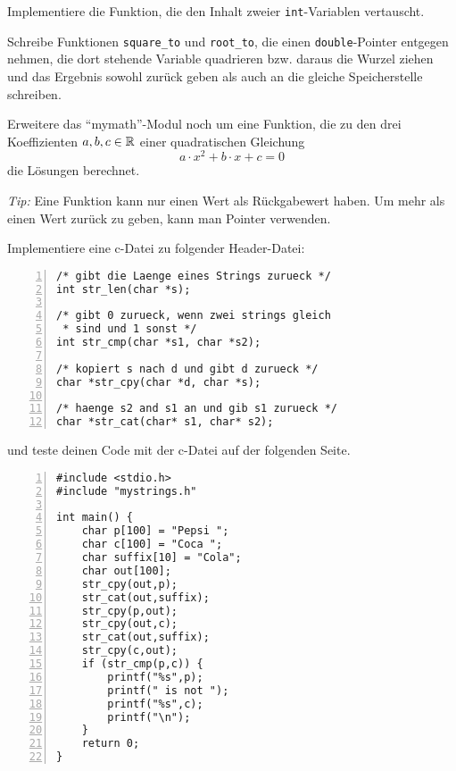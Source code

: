 \documentclass{uebungszettel}
\begin{document}
\begin{aufg}
Implementiere die Funktion, die den Inhalt zweier \verb|int|-Variablen vertauscht.
\end{aufg}

\begin{aufg}
Schreibe Funktionen \verb|square_to| und \verb|root_to|, die einen \verb|double|-Pointer entgegen nehmen, die dort stehende Variable quadrieren bzw. daraus die Wurzel ziehen und das Ergebnis sowohl zurück geben als auch an die gleiche Speicherstelle schreiben.
\end{aufg}

\begin{aufg}
Erweitere das "`mymath"'-Modul noch um eine Funktion, die zu den drei Koeffizienten $a, b, c \in \mathbb{R}$ einer quadratischen Gleichung $$
a \cdot x^2 + b \cdot x + c = 0 $$
die Lösungen berechnet.

\medskip \noindent \emph{Tip:} Eine Funktion kann nur einen Wert als Rückgabewert haben. Um mehr als einen Wert zurück zu geben, kann man Pointer verwenden.
\end{aufg}

\begin{aufg} Implementiere eine c-Datei zu folgender Header-Datei: 
\begin{codelisting}
\begin{lstlisting}[numbers=left,numberstyle=\tiny,frame=tlrb]
/* gibt die Laenge eines Strings zurueck */
int str_len(char *s); 

/* gibt 0 zurueck, wenn zwei strings gleich 
 * sind und 1 sonst */
int str_cmp(char *s1, char *s2);

/* kopiert s nach d und gibt d zurueck */
char *str_cpy(char *d, char *s);

/* haenge s2 and s1 an und gib s1 zurueck */ 
char *str_cat(char* s1, char* s2);
\end{lstlisting}
\end{codelisting}
und teste deinen Code mit der c-Datei auf der folgenden Seite.

\newpage

\begin{codelisting}
\begin{lstlisting}[numbers=left,numberstyle=\tiny,frame=tlrb]
#include <stdio.h>
#include "mystrings.h"

int main() {
	char p[100] = "Pepsi ";
	char c[100] = "Coca ";
	char suffix[10] = "Cola";
	char out[100];
	str_cpy(out,p); 
	str_cat(out,suffix); 
	str_cpy(p,out);
	str_cpy(out,c);
	str_cat(out,suffix);
	str_cpy(c,out);
	if (str_cmp(p,c)) {
		printf("%s",p);
		printf(" is not ");
		printf("%s",c);
		printf("\n");
	}
	return 0;
}
\end{lstlisting}
\end{codelisting}
\end{aufg}
\end{document}
